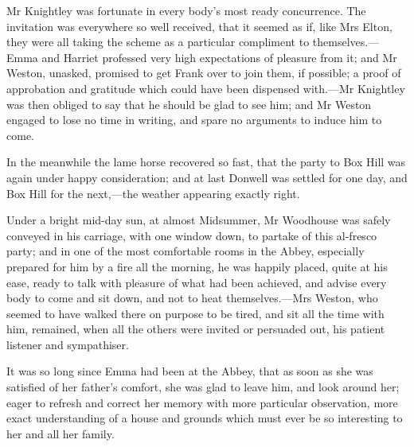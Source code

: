 Mr Knightley was fortunate in every body's most ready concurrence. The invitation was everywhere so well received, that it seemed as if, like Mrs Elton, they were all taking the scheme as a particular compliment to themselves.—Emma and Harriet professed very high expectations of pleasure from it; and Mr Weston, unasked, promised to get Frank over to join them, if possible; a proof of approbation and gratitude which could have been dispensed with.—Mr Knightley was then obliged to say that he should be glad to see him; and Mr Weston engaged to lose no time in writing, and spare no arguments to induce him to come.

In the meanwhile the lame horse recovered so fast, that the party to Box Hill was again under happy consideration; and at last Donwell was settled for one day, and Box Hill for the next,—the weather appearing exactly right.

Under a bright mid-day sun, at almost Midsummer, Mr Woodhouse was safely conveyed in his carriage, with one window down, to partake of this al-fresco party; and in one of the most comfortable rooms in the Abbey, especially prepared for him by a fire all the morning, he was happily placed, quite at his ease, ready to talk with pleasure of what had been achieved, and advise every body to come and sit down, and not to heat themselves.—Mrs Weston, who seemed to have walked there on purpose to be tired, and sit all the time with him, remained, when all the others were invited or persuaded out, his patient listener and sympathiser.

It was so long since Emma had been at the Abbey, that as soon as she was satisfied of her father's comfort, she was glad to leave him, and look around her; eager to refresh and correct her memory with more particular observation, more exact understanding of a house and grounds which must ever be so interesting to her and all her family.

